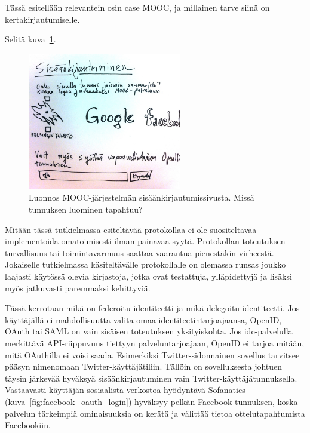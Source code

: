\documentclass[finnish,gradu]{tktltiki}
\begin{document}
  Tässä esitellään relevantein osin case MOOC, ja millainen tarve siinä on kertakirjautumiselle.


  Selitä kuva~\ref{fig:mooc_login_luonnos}.

  \begin{figure}
    \centering
    \includegraphics[width=0.6\textwidth]{images/mooc_login_sketch.jpg}
    \caption{Luonnos MOOC-järjestelmän sisäänkirjautumissivusta. Missä tunnuksen luominen tapahtuu?}
    \label{fig:mooc_login_luonnos}
  \end{figure}


  Mitään tässä tutkielmassa esiteltävää protokollaa ei ole suositeltavaa implementoida omatoimisesti ilman painavaa syytä. Protokollan toteutuksen turvallisuus tai toimintavarmuus saattaa vaarantua pienestäkin virheestä. Jokaiselle tutkielmassa käsiteltävälle protokollalle on olemassa runsas joukko laajasti käytössä olevia kirjastoja, jotka ovat testattuja, ylläpidettyjä ja lisäksi myös jatkuvasti paremmaksi kehittyviä.

  Tässä kerrotaan mikä on federoitu identiteetti ja mikä delegoitu identiteetti.
  Jos käyttäjällä ei mahdollisuutta valita omaa identiteetintarjoajaansa, OpenID, OAuth tai SAML on vain sisäisen toteutuksen yksityiskohta. Jos idc-palvelulla merkittävä API-riippuvuus tiettyyn palveluntarjoajaan, OpenID ei tarjoa mitään, mitä OAuthilla ei voisi saada. Esimerkiksi Twitter-sidonnainen sovellus tarvitsee pääsyn nimenomaan Twitter-käyttäjätiliin. Tällöin on sovelluksesta johtuen täysin järkevää hyväksyä sisäänkirjautuminen vain Twitter-käyttäjätunnuksella. Vastaavasti käyttäjän sosiaalista verkostoa hyödyntävä Sofanatics (kuva~\ref{fig:facebook_oauth_login}) hyväksyy pelkän Facebook-tunnuksen, koska palvelun tärkeimpiä ominaisuuksia on kerätä ja välittää tietoa ottelutapahtumista Facebookiin.
\end{document}
